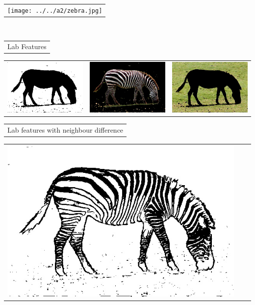 \documentclass{article}
\begin{document}
\begin{center}
\begin{tabular}{c}
\texttt{[image: ../../a2/zebra.jpg]}
\end{tabular}
\\
\begin{tabular}{c}

Lab Features \\
\end{tabular}
 \begin{tabular}{c c c} 

 \includegraphics[width=.4\linewidth]{../image-segmentation/output/Lab/zebra_mask.jpg} & 
 
 \includegraphics[width=.4\linewidth]{../image-segmentation/output/Lab/zebra_seg1.jpg} & \includegraphics[width=.4\linewidth]{../image-segmentation/output/Lab/zebra_seg2.jpg} \\
  
 \end{tabular}
 \begin{tabular}{c}

Lab features with neighbour difference \\
\end{tabular}
 \begin{tabular}{c c c} 

 \includegraphics[width=.4\linewidth]{../image-segmentation/output/add-Lab-neighbor-diff-feature/zebra_mask.jpg} & 
 

\end{tabular}
\end{center}
\end{document}
